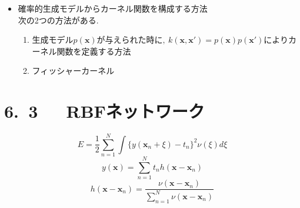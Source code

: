 \documentclass[11pt,a4paper]{jreport}
\begin{document}
\begin{itemize}
\begin{itembox}[l]{新たなカーネルを構成する方法}
\begin{eqnarray*}
    k(\textbf{x},\textbf{x}')&=&q(k_1(\textbf{x},\textbf{x}'))\\
    k(\textbf{x},\textbf{x}')&=&exp(k_1(\textbf{x},\textbf{x}'))\\
    k(\textbf{x},\textbf{x}')&=&k_1(\textbf{x},\textbf{x}') + k_2(\textbf{x},\textbf{x}')\\
    k(\textbf{x},\textbf{x}')&=&k_1(\textbf{x},\textbf{x}')k_2(\textbf{x},\textbf{x}')\\
    k(\textbf{x},\textbf{x}')&=&k_3(\bf{\phi}(\textbf{x}),\bf{\phi}(\textbf{x}'))\\
    k(\textbf{x},\textbf{x}')&=&\textbf{x}^T\textbf{A}\textbf{x}'\\
    k(\textbf{x},\textbf{x}')&=&k_a(\textbf{x}_a,\textbf{x}'_a) + k_b(\textbf{x}_b,\textbf{x}'_b)\\
    k(\textbf{x},\textbf{x}')&=&k_a(\textbf{x}_a,\textbf{x}'_a)k_b(\textbf{x}_b,\textbf{x}'_b)\\
  \end{eqnarray*}
  \end{itembox}
  構成要素としてよく使われるカーネル関数には,~以下の2つがある.\\
  \begin{enumerate}
    \item 多項式カーネル
    \begin{equation}
      k(\textbf{x},\textbf{x}')=(\textbf{x}^T\textbf{x}')^M
    \end{equation}
    \item ガウスカーネル
    \begin{equation}
      k(\textbf{x},\textbf{x}')=exp(-\|\textbf{x}-\textbf{x}'\|^2/2\sigma^2)
    \end{equation}
  \end{enumerate}
  \item 確率的生成モデルからカーネル関数を構成する方法\\
  次の2つの方法がある.
  \begin{enumerate}
    \item 生成モデル$p(\textbf{x})が与えられた時に,~k(\textbf{x},\textbf{x}')=p(\textbf{x})p(\textbf{x}')$によりカーネル関数を定義する方法
    \item フィッシャーカーネル
  \end{enumerate}
\end{itemize}
\section*{6.~3~~~RBFネットワーク}
\begin{equation}
  E=\frac{1}{2}\sum_{n=1}^{N}\int\{y(\textbf{x}_n + \xi) - t_n\}^2\nu(\xi)d\xi
\end{equation}
\begin{equation}
  y(\textbf{x})=\sum_{n=1}^N t_nh(\textbf{x}-\textbf{x}_n)
\end{equation}
\begin{equation}
  h(\textbf{x}-\textbf{x}_n)=\frac{\nu(\textbf{x}-\textbf{x}_n)}{\sum_{n=1}^N\nu(\textbf{x}-\textbf{x}_n)}
\end{equation}
\end{document}
